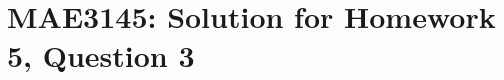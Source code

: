 \documentclass[10pt]{article}
\date{}
\theoremstyle{plain}\theorembodyfont{\normalfont}
\newtheorem{prob}{Problem}[section]
\newenvironment{subprob}%
{\renewcommand{\theenumi}{\alph{enumi}}\renewcommand{\labelenumi}{(\theenumi)}\begin{enumerate}}%
{\end{enumerate}}%
\begin{document}
\pagestyle{empty}
\section*{MAE3145: Solution for Homework 5, Question 3}

%
%
\end{document}
